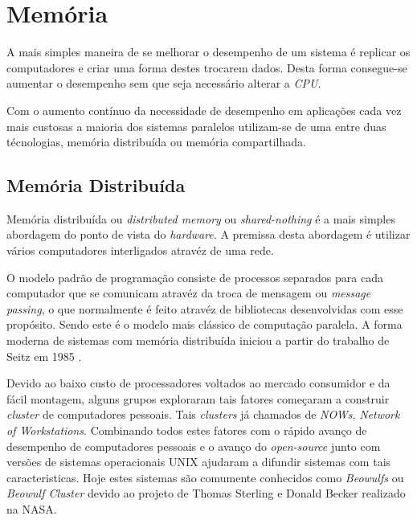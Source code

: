 \chapter{Memória}

A mais simples maneira de se melhorar o desempenho de um sistema é
replicar os computadores e criar uma forma destes trocarem dados.
Desta forma consegue-se aumentar o desempenho sem que seja necessário alterar a
\textit{CPU}.

Com o aumento contínuo da necessidade de desempenho em aplicações cada vez mais
custosas a maioria dos sistemas paralelos utilizam-se de uma entre duas
técnologias, memória distribuída ou memória compartilhada.


\section{Memória Distribuída}

Memória distribuída ou \textit{distributed memory} ou \textit{shared-nothing} é
a mais simples abordagem do ponto de vista do \textit{hardware}. 
A premissa desta abordagem é utilizar vários computadores interligados atravéz 
de uma rede.

O modelo padrão de programação consiste de processos separados para cada
computador que se comunicam atravéz da troca de mensagem ou 
\textit{message passing}, o que normalmente é feito atravéz de bibliotecas
desenvolvidas com esse propósito. 
Sendo este é o modelo mais clássico de computação paralela. 
A forma moderna de sistemas com memória distribuída iniciou a partir do trabalho 
de Seitz em 1985 \cite{Seitz:1985}.

Devido ao baixo custo de processadores voltados ao mercado consumidor e da fácil
montagem, alguns grupos exploraram tais fatores começaram a construir
\textit{cluster} de computadores pessoais. 
Tais \textit{clusters} já chamados de \textit{NOWs}, 
\textit{Network of Workstations}.
Combinando todos estes fatores com o rápido avanço de desempenho de computadores
pessoais e o avanço do \textit{open-source} junto com  versões de sistemas 
operacionais UNIX ajudaram a difundir sistemas com tais caracteristicas. 
Hoje estes sistemas são comumente conhecidos como \textit{Beowulfs} ou
\textit{Beowulf Cluster} devido ao projeto de Thomas Sterling e Donald Becker
realizado na NASA.

